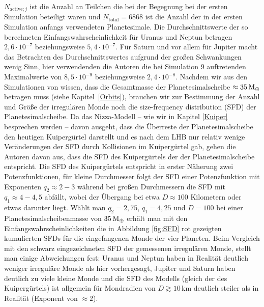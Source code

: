 \documentclass[12pt,a4paper,twoside]{article}
\renewcommand{\cite}{\citep}
\newcommand{\refsec}[1]{siehe Kapitel~\ref{#1}}
\newcommand{\ME}{M_\oplus}
\begin{document}
$N_{\mathrm{active}; j}$ ist die Anzahl an Teilchen die bei der Begegnung bei der ersten Simulation beteiligt waren und $N_{\mathrm{total}} = 6868$ ist die Anzahl der in der ersten Simulation anfangs verwendeten Planetesimale\cite{Nesvorny2007}. %
Die Durchschnittswerte der so berechneten Einfangswahrscheinlichkeit für Uranus und Neptun betragen $2,6 \cdot 10^{-7}$ beziehungsweise $5,4 \cdot 10^{-7}$.
Für Saturn und vor allem für Jupiter macht das Betrachten des Durchschnittswertes aufgrund der großen Schwankungen wenig Sinn, hier verwendenden die Autoren die bei Simulation 9 auftretenden Maximalwerte von $8,5 \cdot 10^{-9}$ beziehungsweise $2,4 \cdot 10^{-8}$\cite{Nesvorny2007}.
Nachdem wir aus den Simulationen von \cite{Tsiganis2005} wissen, dass die Gesamtmasse der Planetesimalscheibe $\approx\unit[35]{\ME}$ betragen muss (\refsec{Orbits}), %
brauchen wir zur Bestimmung der Anzahl und Größe der irregulären Monde noch die size-frequency distribution (SFD) der Planetesimalscheibe. %
Da das Nizza-Modell – wie wir in Kapitel \ref{Kuiper} besprechen werden – davon ausgeht, dass die Überreste der Planetesimalscheibe den heutigen Kuipergürtel darstellt und es nach dem LHB nur relativ wenige Veränderungen der SFD durch Kollisionen im Kuipergürtel gab, gehen die Autoren davon aus, dass die SFD des Kuipergürtels der der Planetesimalscheibe entspricht\cite{Nesvorny2007}.
Die SFD des Kuipergürtels entspricht in erster Näherung zwei Potenzfunktionen, für kleine Durchmesser folgt der SFD einer Potenzfunktion mit Exponenten $q_2 \approx 2-3$ während bei großen Durchmessern die SFD mit $q_1 \approx 4-4,5$ abfällt, wobei der Übergang bei etwa $D \approx 100$ Kilometern oder etwas darunter liegt\cite{Nesvorny2007}. %
Wählt man $q_2 = 2,75$, $q_1 = 4,25$ und $D = 100$ bei einer Planetesimalscheibenmasse von $\unit[35]{\ME}$ erhält man mit den  Einfangswahrscheinlichkeiten die in Abbildung \ref{fig:SFD} rot gezeigten kumulierten SFDs für die eingefangenen Monde der vier Planeten. %
Beim Vergleich mit den schwarz eingezeichneten SFD der gemessenen irregulären Monde, %
stellt man einige Abweichungen fest:
Uranus und Neptun haben in Realität deutlich weniger irreguläre Monde als hier vorhergesagt, %
Jupiter und Saturn haben deutlich zu viele kleine Monde und die SFD des Modells (gleich der des Kuipergürtels) ist allgemein für Mondradien von $D\gtrsim 10 \, \mathrm{km}$ deutlich steiler als in Realität (Exponent von $\approx2$)\cite{Nesvorny2007}.
\end{document}
